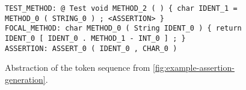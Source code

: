 

\begin{figure}[t]
  \begin{lstlisting}[basicstyle=\ttfamily\fontsize{6.7}{7}\selectfont,aboveskip=0pt,belowskip=0pt]
TEST_METHOD: @ Test void METHOD_2 ( ) { char IDENT_1 = METHOD_0 ( STRING_0 ) ; <ASSERTION> }
FOCAL_METHOD: char METHOD_0 ( String IDENT_0 ) { return IDENT_0 [ IDENT_0 . METHOD_1 - INT_0 ] ; }
ASSERTION: ASSERT_0 ( IDENT_0 , CHAR_0 )
  \end{lstlisting}
  \caption{%
    Abstraction of the token sequence from \cref{fig:example-assertion-generation}.
  }\label{fig:tokenised-abstract-method}
\end{figure}
